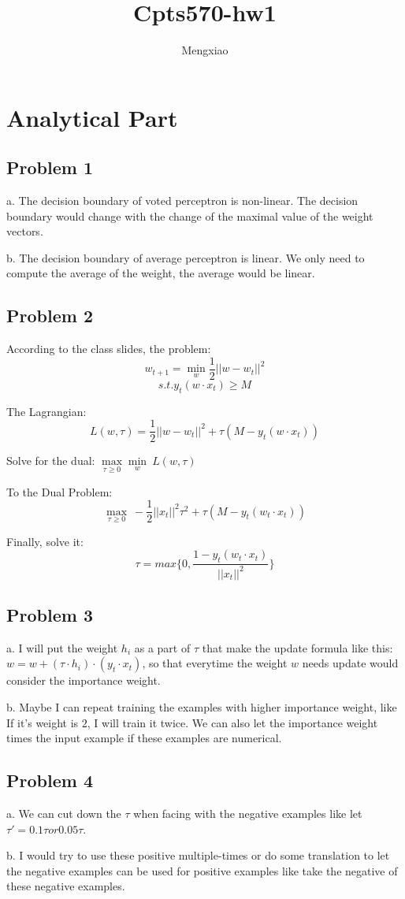 \documentclass[12pt]{article}
\author{Mengxiao}
\title{Cpts570-hw1}
\begin{document}
	\maketitle
	\pagebreak
	\section{Analytical Part}
		\subsection{Problem 1}
			\par a. The decision boundary of voted perceptron is non-linear. The decision boundary would change with the change of the maximal value of the weight vectors.
			\par b. The decision boundary of average perceptron is linear.	We only need to compute the average of the weight, the average would be linear.
		\subsection{Problem 2}
			\par According to the class slides, the problem:
$$ w_{t+1} = \min\limits_w\frac{1}{2} ||w-w_t||^2$$
$$ s.t. y_t(w\cdot x_t)\geq M$$
			\par The Lagrangian:
$$ L(w,\tau)=\frac{1}{2} ||w-w_t||^2+\tau(M-y_t(w\cdot x_t)) $$
			\par Solve for the dual:	$\max\limits_{\tau\ge0}\min\limits_w\ L(w,\tau)$
			\par To the Dual Problem: 
$$ \max\limits_{\tau\ge0}\ -\frac{1}{2}||x_t||^2\tau^2+\tau(M-y_t(w_t\cdot x_t))$$
			\par Finally, solve it:
$$ \tau = max\{0, \frac{1-y_t(w_t\cdot x_t)}{||x_t||^2}\} $$
		\subsection{Problem 3}
				\par\qquad a. I will put the weight $h_i$ as a part of $\tau$ that make the update formula like this: $w=w+(\tau\cdot h_i)\cdot(y_t\cdot x_t)$, so that everytime the weight $w$ needs update would consider the importance weight.
				\par b. Maybe I can repeat training the examples with higher importance weight, like If it's weight is $2$, I will train it twice. We can also let the importance weight times the input example if these examples are numerical.
		\subsection{Problem 4}
				\par\qquad a. We can cut down the $\tau$ when facing with the negative examples like let $\tau' = 0.1\tau or 0.05\tau$.
				\par b. I would try to use these positive multiple-times or do some translation to let the negative examples can be used for positive examples like take the negative of these negative examples.
\end{document}
